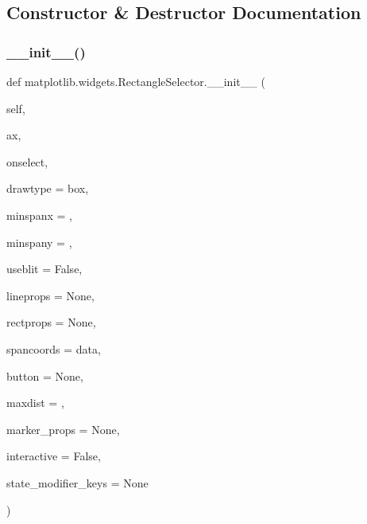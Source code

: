 \subsection{Constructor \& Destructor Documentation}
\mbox{\label{classmatplotlib_1_1widgets_1_1RectangleSelector_a62a9c79bc001b6d53548b4a1b091c86f}} 
\subsubsection{\texorpdfstring{\+\_\+\+\_\+init\+\_\+\+\_\+()}{\_\_init\_\_()}}
{\footnotesize\ttfamily def matplotlib.\+widgets.\+Rectangle\+Selector.\+\_\+\+\_\+init\+\_\+\+\_\+ (\begin{DoxyParamCaption}\item[{}]{self,  }\item[{}]{ax,  }\item[{}]{onselect,  }\item[{}]{drawtype = {\ttfamily \textquotesingle{}box\textquotesingle{}},  }\item[{}]{minspanx = {},  }\item[{}]{minspany = {},  }\item[{}]{useblit = {\ttfamily False},  }\item[{}]{lineprops = {\ttfamily None},  }\item[{}]{rectprops = {\ttfamily None},  }\item[{}]{spancoords = {\ttfamily \textquotesingle{}data\textquotesingle{}},  }\item[{}]{button = {\ttfamily None},  }\item[{}]{maxdist = {},  }\item[{}]{marker\+\_\+props = {\ttfamily None},  }\item[{}]{interactive = {\ttfamily False},  }\item[{}]{state\+\_\+modifier\+\_\+keys = {\ttfamily None} }\end{DoxyParamCaption})}

